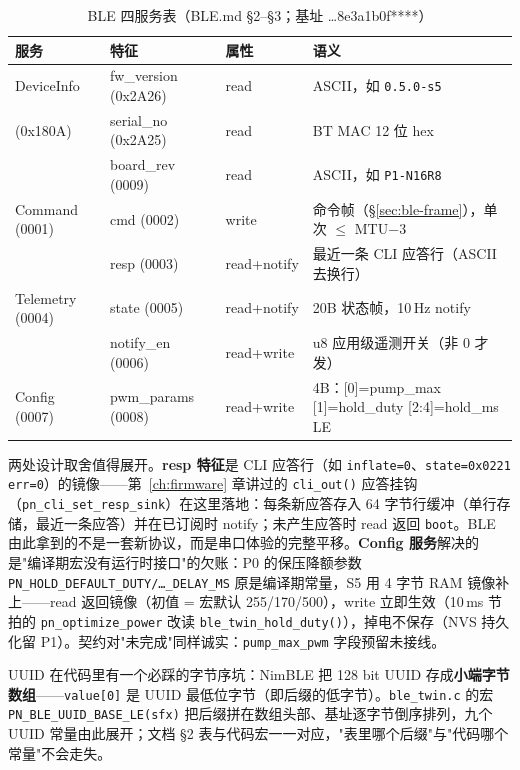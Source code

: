 \begin{table}[htbp]
  \centering
  \caption{BLE 四服务表（BLE.md \S2--\S3；基址 \dots8e3a1b0f****）}
  \label{tab:ble-svc}
  \begin{tabular}{lllp{4.9cm}}
    \toprule
    服务 & 特征 & 属性 & 语义 \\
    \midrule
    DeviceInfo & fw\_version (0x2A26) & read & ASCII，如 \texttt{0.5.0-s5} \\
    (0x180A) & serial\_no (0x2A25) & read & BT MAC 12 位 hex \\
     & board\_rev (0009) & read & ASCII，如 \texttt{P1-N16R8} \\
    \midrule
    Command (0001) & cmd (0002) & write & 命令帧（\S\ref{sec:ble-frame}），单次 $\le$ MTU$-$3 \\
     & resp (0003) & read+notify & 最近一条 CLI 应答行（ASCII 去换行） \\
    \midrule
    Telemetry (0004) & state (0005) & read+notify & 20B 状态帧，10\,Hz notify \\
     & notify\_en (0006) & read+write & u8 应用级遥测开关（非 0 才发） \\
    \midrule
    Config (0007) & pwm\_params (0008) & read+write & 4B：[0]=pump\_max [1]=hold\_duty [2:4]=hold\_ms LE \\
    \bottomrule
  \end{tabular}
\end{table}

两处设计取舍值得展开。\textbf{resp 特征}是 CLI 应答行（如 \texttt{inflate=0}、\texttt{state=0x0221 err=0}）的镜像——第~\ref{ch:firmware} 章讲过的 \texttt{cli\_out()} 应答挂钩（\texttt{pn\_cli\_set\_resp\_sink}）在这里落地：每条新应答存入 64 字节行缓冲（单行存储，最近一条应答）并在已订阅时 notify；未产生应答时 read 返回 \texttt{boot}。BLE 由此拿到的不是一套新协议，而是串口体验的完整平移。\textbf{Config 服务}解决的是"编译期宏没有运行时接口"的欠账：P0 的保压降额参数 \texttt{PN\_HOLD\_DEFAULT\_DUTY/\dots\_DELAY\_MS} 原是编译期常量，S5 用 4 字节 RAM 镜像补上——read 返回镜像（初值 = 宏默认 255/170/500），write 立即生效（10\,ms 节拍的 \texttt{pn\_optimize\_power} 改读 \texttt{ble\_twin\_hold\_duty()}），掉电不保存（NVS 持久化留 P1）。契约对"未完成"同样诚实：\texttt{pump\_max\_pwm} 字段预留未接线。

UUID 在代码里有一个必踩的字节序坑：NimBLE 把 128 bit UUID 存成\textbf{小端字节数组}——\texttt{value[0]} 是 UUID 最低位字节（即后缀的低字节）。\texttt{ble\_twin.c} 的宏 \texttt{PN\_BLE\_UUID\_BASE\_LE(sfx)} 把后缀拼在数组头部、基址逐字节倒序排列，九个 UUID 常量由此展开；文档 \S2 表与代码宏一一对应，"表里哪个后缀"与"代码哪个常量"不会走失。


